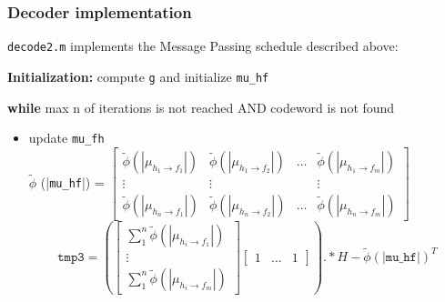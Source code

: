 \documentclass[]{beamer}
\begin{document}

\begin{frame}
\transwipe[direction=0]
\frametitle{Decoder implementation}
\texttt{decode2.m} implements the Message Passing schedule described above:

\vspace{0.3cm}

\textbf{Initialization:} compute \texttt{g} and initialize \texttt{mu\_hf}

 \textbf{while} max n of iterations is not reached AND codeword is not found
\begin{itemize}
\item update \texttt{mu\_fh}\\
		$\tilde \phi$ (|\texttt{mu\_hf}|) = 
		$\begin{bmatrix}
		\tilde \phi(|\mu_{h_1 \rightarrow f_1}|)  & \tilde \phi(|\mu_{h_1 \rightarrow f_2}|) & \dots & \tilde \phi(|\mu_{h_1 \rightarrow f_m}|)\\
		\vdots & \vdots & & \vdots \\
		\tilde \phi(|\mu_{h_n \rightarrow f_1}|)& \tilde \phi(|\mu_{h_n \rightarrow f_2}|) & \dots & \tilde \phi(|\mu_{h_n \rightarrow f_m}|)
		\end{bmatrix}$\\
		
		\begin{equation*}
		\texttt{tmp3} = \left( \begin{bmatrix} \sum_1^n\tilde \phi (|\mu_{h_i \rightarrow f_1}|) \\ \vdots \\ \sum_1^n\tilde \phi (|\mu_{h_i \rightarrow f_m}|) \end{bmatrix} \begin{bmatrix} 1&\dots&1 \end{bmatrix}\right) .*H - \tilde \phi (|\texttt{mu\_hf}|)^T
		\end{equation*}
\end{itemize}
\end{frame}
\end{document}
